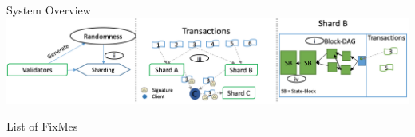 	
	\renewcommand\appendixname{Appendix}
	\appendix
	
	\begin{frame}{System Overview}
		\centering
    \includegraphics[width=1\textwidth]{figures/system-overview.png}
  \end{frame}
	

	
	\begin{frame}{List of FixMes}
		\listoffixmes
	\end{frame}
	
